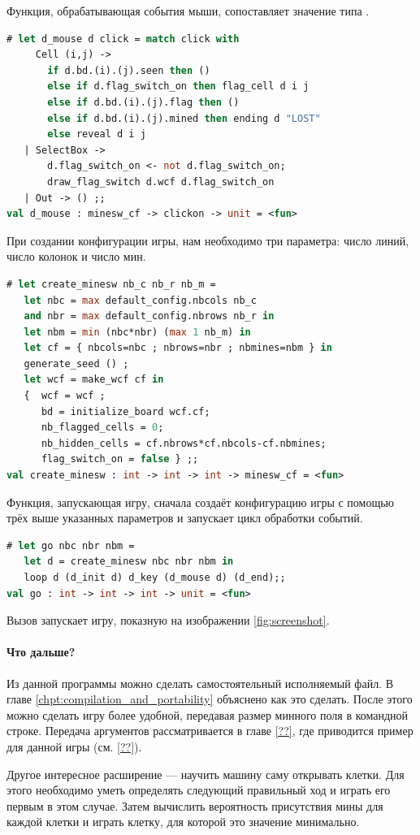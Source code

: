 Функция, обрабатывающая события мыши, сопоставляет значение типа .

\begin{lstlisting}[language=OCaml]
# let d_mouse d click = match click with
     Cell (i,j) ->
       if d.bd.(i).(j).seen then ()
       else if d.flag_switch_on then flag_cell d i j 
       else if d.bd.(i).(j).flag then ()
       else if d.bd.(i).(j).mined then ending d "LOST"
       else reveal d i j
   | SelectBox ->
       d.flag_switch_on <- not d.flag_switch_on;
       draw_flag_switch d.wcf d.flag_switch_on
   | Out -> () ;;
val d_mouse : minesw_cf -> clickon -> unit = <fun>
\end{lstlisting}

При создании конфигурации игры, нам необходимо три параметра: число линий, число 
колонок и число мин.

\begin{lstlisting}[language=OCaml]
# let create_minesw nb_c nb_r nb_m = 
   let nbc = max default_config.nbcols nb_c 
   and nbr = max default_config.nbrows nb_r in 
   let nbm = min (nbc*nbr) (max 1 nb_m) in
   let cf = { nbcols=nbc ; nbrows=nbr ; nbmines=nbm } in 
   generate_seed () ;
   let wcf = make_wcf cf in
   {  wcf = wcf ;
      bd = initialize_board wcf.cf;
      nb_flagged_cells = 0; 
      nb_hidden_cells = cf.nbrows*cf.nbcols-cf.nbmines;
      flag_switch_on = false } ;;
val create_minesw : int -> int -> int -> minesw_cf = <fun>
\end{lstlisting}

Функция, запускающая игру, сначала создаёт конфигурацию игры с помощью трёх 
выше указанных параметров и запускает цикл обработки событий.

\begin{lstlisting}[language=OCaml]
# let go nbc nbr nbm = 
   let d = create_minesw nbc nbr nbm in
   loop d (d_init d) d_key (d_mouse d) (d_end);;
val go : int -> int -> int -> unit = <fun>
\end{lstlisting}

Вызов  запускает игру, показную на изображении 
\ref{fig:screenshot}.

\paragraph{Что дальше?}

Из данной программы можно сделать самостоятельный исполняемый файл. В главе 
\ref{chpt:compilation_and_portability} объяснено как это сделать. После этого 
можно сделать игру более удобной, передавая размер минного поля в командной 
строке. Передача аргументов рассматривается в главе \ref{??}, где приводится 
пример для данной игры (см. \ref{??}).

Другое интересное расширение --- научить машину саму открывать клетки. Для 
этого необходимо уметь определять следующий правильный ход и играть его первым в 
этом случае. Затем вычислить вероятность присутствия мины для каждой клетки и 
играть клетку, для которой это значение минимально.
